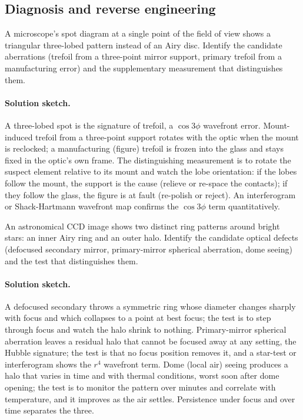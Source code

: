 \subsection*{Diagnosis and reverse engineering}

\begin{exercise}
A microscope's spot diagram at a single point of the field of view
shows a triangular three-lobed pattern instead of an Airy disc.
Identify the candidate aberrations (trefoil from a three-point mirror
support, primary trefoil from a manufacturing error) and the
supplementary measurement that distinguishes them.
\paragraph{Solution sketch.} A three-lobed spot is the signature of
trefoil, a $\cos 3\phi$ wavefront error. Mount-induced trefoil from a
three-point support rotates with the optic when the mount is reclocked;
a manufacturing (figure) trefoil is frozen into the glass and stays
fixed in the optic's own frame. The distinguishing measurement is to
rotate the suspect element relative to its mount and watch the lobe
orientation: if the lobes follow the mount, the support is the cause
(relieve or re-space the contacts); if they follow the glass, the figure
is at fault (re-polish or reject). An interferogram or Shack-Hartmann
wavefront map confirms the $\cos 3\phi$ term quantitatively.
\end{exercise}

\begin{exercise}
An astronomical CCD image shows two distinct ring patterns around
bright stars: an inner Airy ring and an outer halo. Identify the
candidate optical defects (defocused secondary mirror, primary-mirror
spherical aberration, dome seeing) and the test that distinguishes
them.
\paragraph{Solution sketch.} A defocused secondary throws a symmetric
ring whose diameter changes sharply with focus and which collapses to a
point at best focus; the test is to step through focus and watch the
halo shrink to nothing. Primary-mirror spherical aberration leaves a
residual halo that cannot be focused away at any setting, the Hubble
signature; the test is that no focus position removes it, and a
star-test or interferogram shows the $r^{4}$ wavefront term. Dome (local
air) seeing produces a halo that varies in time and with thermal
conditions, worst soon after dome opening; the test is to monitor the
pattern over minutes and correlate with temperature, and it improves as
the air settles. Persistence under focus and over time separates the
three.
\end{exercise}

